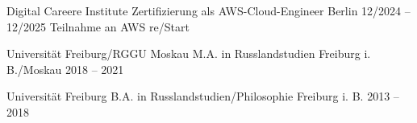 
\begin{cventries}

  \cventry
  {Digital Careere Institute} %
  {Zertifizierung als AWS-Cloud-Engineer} %
  {Berlin} %
  {12/2024 – 12/2025} %
  {Teilnahme an AWS re/Start}
  \vspace{2.0mm}

  \cventry
  {Universität Freiburg/RGGU Moskau} %
  {M.A. in Russlandstudien} %
  {Freiburg i. B./Moskau} %
  {2018 – 2021} %
  {}
  \vspace{2.0mm}

  \cventry
  {Universität Freiburg} %
  {B.A. in Russlandstudien/Philosophie} %
  {Freiburg i. B.} %
  {2013 – 2018} %
  {}

\end{cventries}
